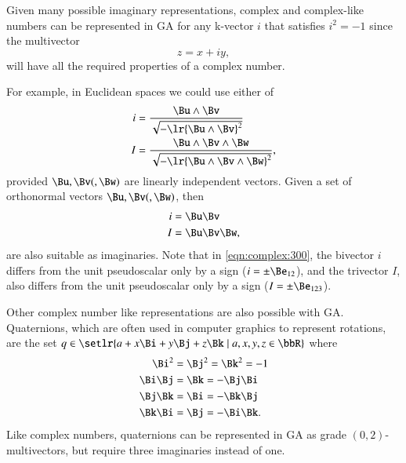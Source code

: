 Given many possible imaginary representations, complex and complex-like numbers can be represented in GA for any k-vector \( i \) that satisfies \( i^2 = -1 \) since the multivector
\begin{dmath}\label{eqn:complex:260}
z = x + i y,
\end{dmath}
will have all the required properties of a complex number.

For example, in Euclidean spaces we could use either of
\begin{dmath}\label{eqn:complex:280}
\begin{aligned}
i &= \frac{\Bu \wedge \Bv}{\sqrt{-\lr{\Bu\wedge\Bv}^2}} \\
I &= \frac{\Bu \wedge \Bv \wedge \Bw}{\sqrt{-\lr{\Bu\wedge\Bv\wedge \Bw}^2}},
\end{aligned}
\end{dmath}
provided \( \Bu, \Bv (,\Bw) \) are linearly independent vectors.
Given a set of orthonormal vectors \( \Bu, \Bv (,\Bw) \), then
\begin{dmath}\label{eqn:complex:300}
\begin{aligned}
i &= \Bu \Bv \\
I &= \Bu \Bv \Bw,
\end{aligned}
\end{dmath}
are also suitable as imaginaries.  Note that in \cref{eqn:complex:300}, the bivector \( i \) differs from the unit  pseudoscalar only by a sign (\( i = \pm \Be_{12} \)), and the trivector \( I \), also differs from the  unit pseudoscalar only by a sign (\( I = \pm \Be_{123} \)).

Other complex number like representations are also possible with GA.
Quaternions, which are often used in computer graphics to represent rotations,
are the set \( q \in \setlr{ a + x \Bi + y \Bj + z \Bk \mid a, x, y, z \in \bbR} \) where
\begin{equation}\label{eqn:complex:1240}
\begin{aligned}
\Bi^2 &= \Bj^2 = \Bk^2 = -1 \\
\Bi \Bj &= \Bk = -\Bj \Bi \\
\Bj \Bk &= \Bi = -\Bk \Bj \\
\Bk \Bi &= \Bj = -\Bi \Bk.
\end{aligned}
\end{equation}
Like complex numbers, quaternions can be represented in GA as grade \((0,2)\)-multivectors, but require three imaginaries instead of one.

